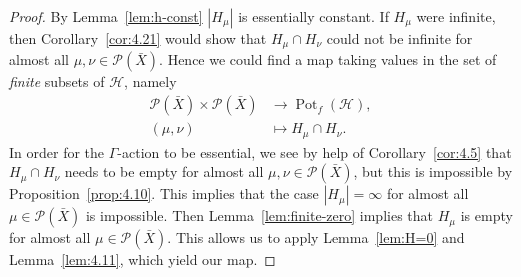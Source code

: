 \begin{proof}
  By Lemma~\ref{lem:h-const} \(|H_\mu|\) is essentially constant. If \(H_\mu\) were infinite, then Corollary~\ref{cor:4.21} would show that \(H_\mu \cap H_\nu\) could not be infinite for almost all \(\mu, \nu \in \mathcal{P}(\bar X)\). Hence we could find a map taking values in the set of \emph{finite} subsets of \(\mathcal{H}\), namely
  \begin{align*}
    \mathcal{P}(\bar X) \times \mathcal{P}(\bar X) & \to \operatorname{Pot}_f(\mathcal{H}),\\
    (\mu,\nu) &\mapsto H_\mu \cap H_\nu.
  \end{align*}
  In order for the \(\Gamma\)-action to be essential, we see by help of Corollary~\ref{cor:4.5} that \(H_\mu \cap H_\nu\) needs to be empty for almost all \(\mu, \nu \in \mathcal{P}(\bar X)\), but this is impossible by Proposition~\ref{prop:4.10}. This implies that the case \(|H_\mu| = \infty\) for almost all \(\mu \in \mathcal{P}(\bar X)\) is impossible. Then Lemma~\ref{lem:finite-zero} implies that \(H_\mu\) is empty for almost all \(\mu \in \mathcal{P}(\bar X)\). This allows us to apply Lemma~\ref{lem:H=0} and Lemma~\ref{lem:4.11}, which yield our map.



\end{proof}
